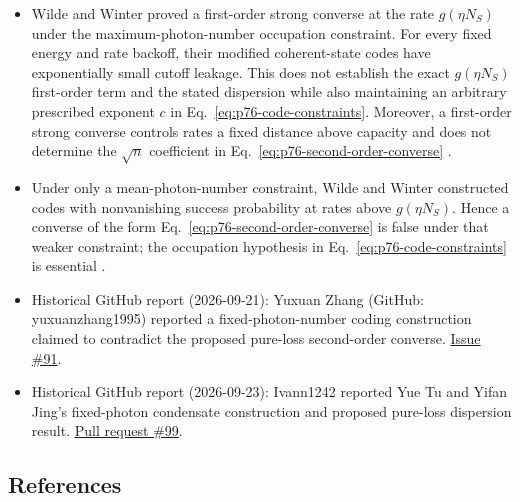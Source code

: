 \begin{itemize}
  \item Wilde and Winter proved a first-order strong converse at the rate
  $g(\eta N_S)$ under the maximum-photon-number occupation constraint.  For
  every fixed energy and rate backoff, their modified coherent-state codes
  have exponentially small cutoff leakage.  This does not establish the
  exact $g(\eta N_S)$ first-order term and the stated dispersion while also
  maintaining an arbitrary prescribed exponent $c$ in
  Eq.~\eqref{eq:p76-code-constraints}.  Moreover, a first-order strong
  converse controls rates a fixed distance above capacity and does not
  determine the
  $\sqrt n$ coefficient in Eq.~\eqref{eq:p76-second-order-converse}
  .

  \item Under only a mean-photon-number constraint, Wilde and Winter
  constructed codes with nonvanishing success probability at rates above
  $g(\eta N_S)$.  Hence a converse of the form
  Eq.~\eqref{eq:p76-second-order-converse} is false under that weaker
  constraint; the occupation hypothesis in
  Eq.~\eqref{eq:p76-code-constraints} is essential
  .

  \item Historical GitHub report (2026-09-21): Yuxuan Zhang (GitHub: yuxuanzhang1995) reported a fixed-photon-number coding construction claimed to contradict the proposed pure-loss second-order converse. \href{https://github.com/Naixu-Guo/quantum-open-problems/issues/91}{Issue \#91}.

  \item Historical GitHub report (2026-09-23): Ivann1242 reported Yue Tu and Yifan Jing's fixed-photon condensate construction and proposed pure-loss dispersion result. \href{https://github.com/Naixu-Guo/quantum-open-problems/pull/99}{Pull request \#99}.
\end{itemize}

\subsection*{References}

